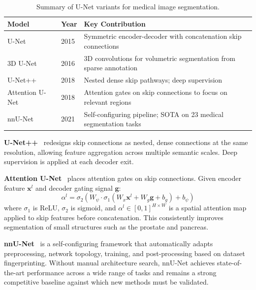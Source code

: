 \documentclass[preprint,12pt,authoryear]{elsarticle}
\begin{document}
\begin{table}[t]
\caption{Summary of U-Net variants for medical image segmentation.}
\label{tab:unet_variants}
\centering
\begin{tabular}{@{}llp{5cm}@{}}
\toprule
\textbf{Model} & \textbf{Year} & \textbf{Key Contribution} \\
\midrule
U-Net~\citep{ronneberger2015unet} & 2015 &
  Symmetric encoder-decoder with concatenation skip connections \\
3D U-Net~\citep{cciccek2016} & 2016 &
  3D convolutions for volumetric segmentation from sparse annotation \\
U-Net++~\citep{zhou2018unetpp} & 2018 &
  Nested dense skip pathways; deep supervision \\
Attention U-Net~\citep{oktay2018} & 2018 &
  Attention gates on skip connections to focus on relevant regions \\
nnU-Net~\citep{isensee2021nnunet} & 2021 &
  Self-configuring pipeline; SOTA on 23 medical segmentation tasks \\
\bottomrule
\end{tabular}
\end{table}

\textbf{U-Net++}~\citep{zhou2018unetpp} redesigns skip connections as nested,
dense connections at the same resolution, allowing feature aggregation across
multiple semantic scales. Deep supervision is applied at each decoder exit.

\textbf{Attention U-Net}~\citep{oktay2018} places attention gates on skip
connections. Given encoder feature $\mathbf{x}^l$ and decoder gating signal
$\mathbf{g}$:
\begin{equation}
  \alpha^l = \sigma_2\!\left(W_\psi \cdot \sigma_1(W_x \mathbf{x}^l +
  W_g \mathbf{g} + b_g) + b_\psi\right)
\end{equation}
where $\sigma_1$ is ReLU, $\sigma_2$ is sigmoid, and
$\alpha^l \in [0,1]^{H \times W}$ is a spatial attention map applied to skip
features before concatenation. This consistently improves segmentation of small
structures such as the prostate and pancreas.

\textbf{nnU-Net}~\citep{isensee2021nnunet} is a self-configuring framework that
automatically adapts preprocessing, network topology, training, and
post-processing based on dataset fingerprinting. Without manual architecture
search, nnU-Net achieves state-of-the-art performance across a wide range of
tasks and remains a strong competitive baseline against which new methods must
be validated.
\end{document}
